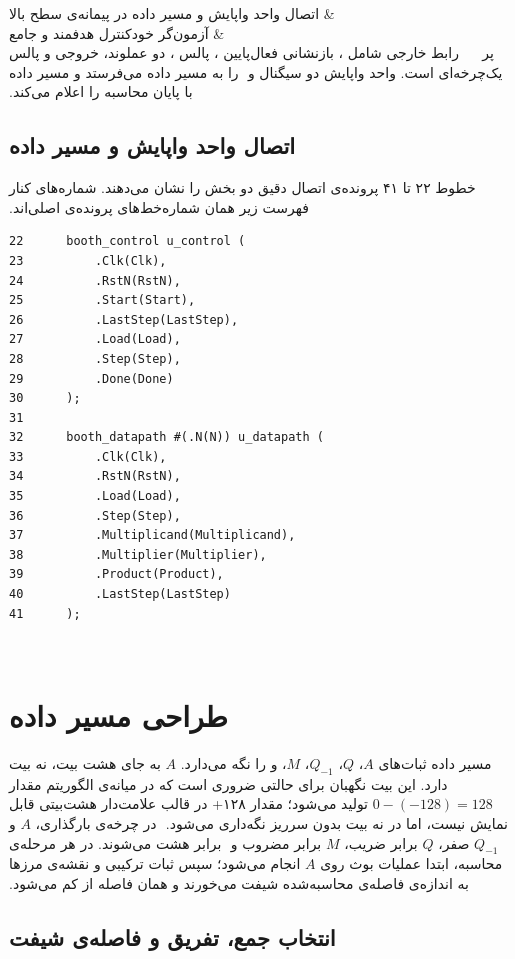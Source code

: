 ‫ & اتصال واحد واپایش و مسیر داده در پیمانه‌ی سطح بالا \\
‫ & آزمون‌گر خودکنترل هدفمند و جامع \\
‫‌پر
‫
‫
‫
‫
‫رابط خارجی شامل ، بازنشانی فعال‌پایین ، پالس ، دو عملوند،
‫خروجی  و پالس یک‌چرخه‌ای  است. واحد واپایش دو سیگنال  و
‫ را به مسیر داده می‌فرستد و مسیر داده با  پایان محاسبه را اعلام می‌کند.
‫
‫
‫\subsection{اتصال واحد واپایش و مسیر داده}
‫
‫خطوط ۲۲ تا ۴۱ پرونده‌ی  اتصال دقیق دو بخش را نشان می‌دهند.
‫شماره‌های کنار فهرست زیر همان شماره‌خط‌های پرونده‌ی اصلی‌اند.
‫
\begin{dsdlcodeblock}
\begin{verbatim}
22      booth_control u_control (
23          .Clk(Clk),
24          .RstN(RstN),
25          .Start(Start),
26          .LastStep(LastStep),
27          .Load(Load),
28          .Step(Step),
29          .Done(Done)
30      );
31
32      booth_datapath #(.N(N)) u_datapath (
33          .Clk(Clk),
34          .RstN(RstN),
35          .Load(Load),
36          .Step(Step),
37          .Multiplicand(Multiplicand),
38          .Multiplier(Multiplier),
39          .Product(Product),
40          .LastStep(LastStep)
41      );
\end{verbatim}
\end{dsdlcodeblock}
‫
‫
‫\section{طراحی مسیر داده}
‫
‫مسیر داده ثبات‌های $A$، $Q$، $Q_{-1}$، $M$،  و  را نگه
‫می‌دارد. $A$ به جای هشت بیت، نه بیت دارد. این بیت نگهبان برای حالتی ضروری است که در
‫میانه‌ی الگوریتم مقدار $0-(-128)=128$ تولید می‌شود؛ مقدار ۱۲۸+ در قالب علامت‌دار هشت‌بیتی
‫قابل نمایش نیست، اما در نه بیت بدون سرریز نگه‌داری می‌شود.
‫
‫در چرخه‌ی بارگذاری، $A$ و $Q_{-1}$ صفر، $Q$ برابر ضریب، $M$ برابر مضروب و
‫ برابر هشت می‌شوند. در هر مرحله‌ی محاسبه، ابتدا عملیات بوث روی $A$ انجام
‫می‌شود؛ سپس ثبات ترکیبی و نقشه‌ی مرزها به اندازه‌ی فاصله‌ی محاسبه‌شده شیفت می‌خورند و همان
‫فاصله از  کم می‌شود.
‫
‫
‫\subsection{انتخاب جمع، تفریق و فاصله‌ی شیفت}
